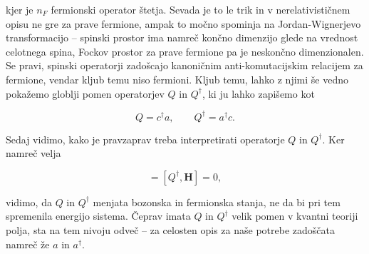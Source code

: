 \ni kjer je $n_F$ fermionski operator \v stetja. Sevada je to le trik in v nerelativisti\v cnem opisu ne gre za prave fermione,
ampak to mo\v cno spominja na Jordan-Wignerjevo transformacijo -- spinski prostor ima namre\v c kon\v cno dimenzijo glede na vrednost
celotnega spina, Fockov prostor za prave fermione pa je neskon\v cno dimenzionalen. Se pravi, spinski operatorji zado\v scajo
kanoni\v cnim anti-komutacijskim relacijem za fermione, vendar kljub temu niso fermioni. Kljub temu, lahko z njimi \v se
vedno poka\v zemo globlji pomen operatorjev $Q$ in $Q^\dagger$, ki ju lahko zapi\v semo kot

\begin{equation}
	Q = c^\dagger a, \qquad Q^\dagger = a^\dagger c.
\end{equation}

\ni Sedaj vidimo, kako je pravzaprav treba interpretirati operatorje $Q$ in $Q^\dagger$. Ker namre\v c
velja

\begin{equation}
	[Q, \mathbf{H}] = [Q^\dagger, \mathbf{H}] = 0,
\end{equation}

\ni vidimo, da $Q$ in $Q^\dagger$ menjata bozonska in fermionska stanja, ne da bi pri tem spremenila energijo sistema.
\v Ceprav imata $Q$ in $Q^\dagger$ velik pomen v kvantni teoriji polja, sta na tem nivoju odve\v c -- za celosten opis
za na\v se potrebe zado\v s\v cata namre\v c \v ze $a$ in $a^\dagger$.

